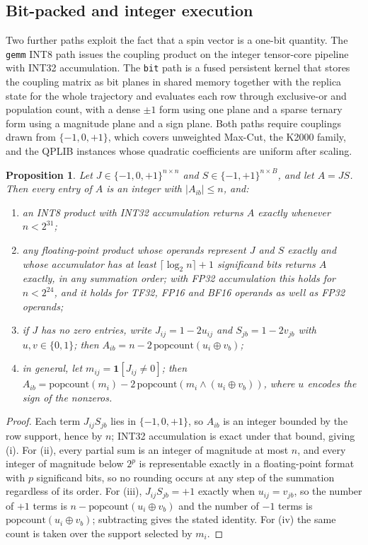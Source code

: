 \documentclass[11pt,a4paper]{article}
\newcommand{\code}[1]{\texttt{#1}}
\newtheorem{proposition}{Proposition}
\begin{document}
\subsection{Bit-packed and integer execution}\label{sec:bitexact}
Two further paths exploit the fact that a spin vector is a one-bit quantity. The \code{gemm} INT8 path issues the coupling product on the integer tensor-core pipeline with INT32 accumulation. The \code{bit} path is a fused persistent kernel that stores the coupling matrix as bit planes in shared memory together with the replica state for the whole trajectory and evaluates each row through exclusive-or and population count, with a dense $\pm1$ form using one plane and a sparse ternary form using a magnitude plane and a sign plane. Both paths require couplings drawn from $\{-1,0,+1\}$, which covers unweighted Max-Cut, the K2000 family, and the QPLIB instances whose quadratic coefficients are uniform after scaling.

\begin{proposition}
\label{prop:exact}
Let $J\in\{-1,0,+1\}^{n\times n}$ and $S\in\{-1,+1\}^{n\times B}$, and let $A=JS$. Then every entry of $A$ is an integer with $|A_{ib}|\le n$, and:
\begin{enumerate}
\item[(i)] an INT8 product with INT32 accumulation returns $A$ exactly whenever $n<2^{31}$;
\item[(ii)] any floating-point product whose operands represent $J$ and $S$ exactly and whose accumulator has at least $\lceil\log_2 n\rceil+1$ significand bits returns $A$ exactly, in any summation order; with FP32 accumulation this holds for $n<2^{24}$, and it holds for TF32, FP16 and BF16 operands as well as FP32 operands;
\item[(iii)] if $J$ has no zero entries, write $J_{ij}=1-2u_{ij}$ and $S_{jb}=1-2v_{jb}$ with $u,v\in\{0,1\}$; then $A_{ib}=n-2\,\mathrm{popcount}\!\left(u_i\oplus v_b\right)$;
\item[(iv)] in general, let $m_{ij}=\mathbf{1}[J_{ij}\neq 0]$; then $A_{ib}=\mathrm{popcount}(m_i)-2\,\mathrm{popcount}\!\left(m_i\wedge(u_i\oplus v_b)\right)$, where $u$ encodes the sign of the nonzeros.
\end{enumerate}
\end{proposition}

\begin{proof}
Each term $J_{ij}S_{jb}$ lies in $\{-1,0,+1\}$, so $A_{ib}$ is an integer bounded by the row support, hence by $n$; INT32 accumulation is exact under that bound, giving (i). For (ii), every partial sum is an integer of magnitude at most $n$, and every integer of magnitude below $2^{p}$ is representable exactly in a floating-point format with $p$ significand bits, so no rounding occurs at any step of the summation regardless of its order. For (iii), $J_{ij}S_{jb}=+1$ exactly when $u_{ij}=v_{jb}$, so the number of $+1$ terms is $n-\mathrm{popcount}(u_i\oplus v_b)$ and the number of $-1$ terms is $\mathrm{popcount}(u_i\oplus v_b)$; subtracting gives the stated identity. For (iv) the same count is taken over the support selected by $m_i$.
\end{proof}
\end{document}
